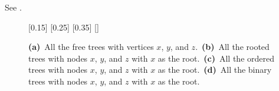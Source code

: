 See .
\begin{figure}[htb]
    \subcaptionbox{\label{fig:B.5-1a}}[0.15\textwidth]{}
    \subcaptionbox{\label{fig:B.5-1b}}[0.25\textwidth]{}
    \subcaptionbox{\label{fig:B.5-1c}}[0.35\textwidth]{}
    \subcaptionbox{\label{fig:B.5-1d}}[\textwidth]{}
    \caption{\textbf{(a)}\, All the free trees with vertices $x$, $y$, and $z$.\,
    \textbf{(b)}\, All the rooted trees with nodes $x$, $y$, and $z$ with $x$ as the root.\,
    \textbf{(c)}\, All the ordered trees with nodes $x$, $y$, and $z$ with $x$ as the root.\,
    \textbf{(d)}\, All the binary trees with nodes $x$, $y$, and $z$ with $x$ as the root.} \label{fig:B.5-1}
\end{figure}
